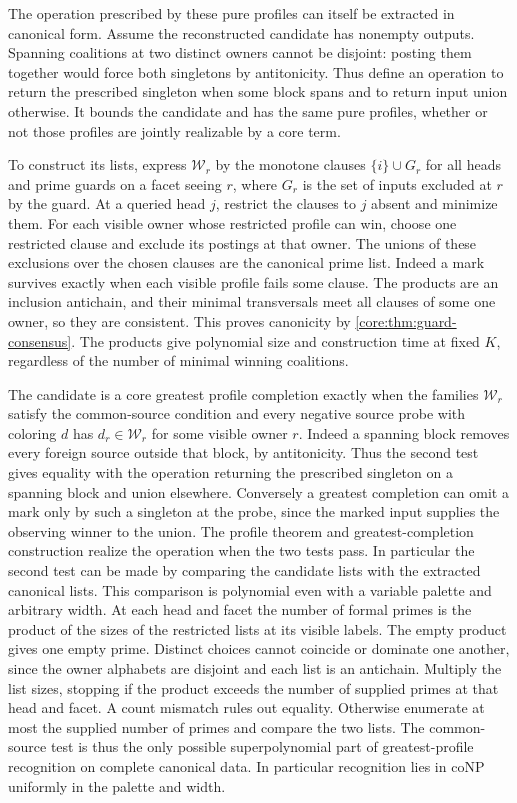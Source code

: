 The operation prescribed by these pure profiles can itself
be extracted in canonical form. Assume the reconstructed
candidate has nonempty outputs. Spanning coalitions at two
distinct owners cannot be disjoint: posting them together
would force both singletons by antitonicity. Thus define an
operation to return the prescribed singleton when some
block spans and to return input union otherwise. It bounds
the candidate and has the same pure profiles, whether or
not those profiles are jointly realizable by a core term.

To construct its lists, express $\mathcal W_r$ by the
monotone clauses $\{i\}\cup G_r$ for all heads and prime
guards on a facet seeing $r$, where $G_r$ is the set of
inputs excluded at $r$ by the guard. At a queried head
$j$, restrict the clauses to $j$ absent and minimize them.
For each visible owner whose restricted profile can win,
choose one restricted clause and exclude its postings at
that owner. The unions of these exclusions over the chosen
clauses are the canonical prime list. Indeed a mark survives
exactly when each visible profile fails some clause. The
products are an inclusion antichain, and their minimal
transversals meet all clauses of some one owner, so they
are consistent. This proves canonicity by
\cref{core:thm:guard-consensus}. The products give polynomial
size and construction time at fixed $K$, regardless of the
number of minimal winning coalitions.

The candidate is a core greatest profile completion exactly when
the families $\mathcal W_r$ satisfy the common-source condition
and every negative source probe with coloring $d$ has
$d_r\in\mathcal W_r$ for some visible owner $r$.
Indeed a spanning block removes every foreign source outside that
block, by antitonicity. Thus the second test gives equality with
the operation returning the prescribed singleton on a spanning
block and union elsewhere. Conversely a greatest completion
can omit a mark only by such a singleton at the probe, since
the marked input supplies the observing winner to the union.
The profile theorem and greatest-completion construction realize
the operation when the two tests pass.
In particular the second test can be made by comparing the
candidate lists with the extracted canonical lists.
This comparison is polynomial even with a variable palette
and arbitrary width. At each head and facet the number of
formal primes is the product of the sizes of the restricted
lists at its visible labels. The empty product gives one
empty prime. Distinct choices cannot coincide or dominate
one another, since the owner alphabets are disjoint and
each list is an antichain. Multiply the list sizes, stopping
if the product exceeds the number of supplied primes at
that head and facet. A count mismatch rules out equality.
Otherwise enumerate at most the supplied number of primes
and compare the two lists. The common-source test is thus
the only possible superpolynomial part of greatest-profile
recognition on complete canonical data. In particular
recognition lies in coNP uniformly in the palette and width.

